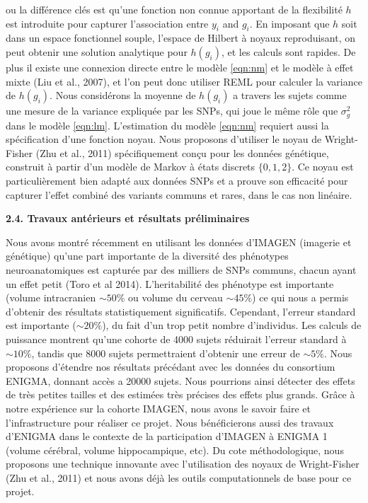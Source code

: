 \documentclass[12pt]{article}
\begin{document}
ou la diff\'erence cl\'es est qu'une fonction non connue apportant de la flexibilit\'e $h$ est introduite pour capturer l'association entre $y_i$ and $g_i$. En imposant que $h$ soit dans un espace fonctionnel souple, l'espace de Hilbert \`a noyaux reproduisant, on peut obtenir une solution analytique pour $h(g_i)$, et les calculs sont rapides. De plus il existe une connexion directe entre le mod\`ele  \eqref{eqn:nm} et le mod\`ele \`a effet mixte (Liu et al., 2007), et l'on peut donc utiliser REML pour calculer la variance de $h(g_i)$. Nous consid\'erons la moyenne de $h(g_i)$ a travers les sujets comme une mesure de la variance expliqu\'ee par les SNPs, qui joue le même rôle que $\sigma^2_g$ dans le mod\`ele \eqref{eqn:lm}. L'estimation du mod\`ele  \eqref{eqn:nm} requiert aussi la sp\'ecification d'une fonction noyau. Nous proposons d'utiliser le noyau de  Wright-Fisher (Zhu et al., 2011) sp\'ecifiquement conçu pour les donn\'ees g\'en\'etique, construit \`a partir d'un mod\`ele de Markov \`a \'etats discrets  $\{0,1,2\}$. Ce noyau est particuli\`erement bien adapt\'e aux donn\'ees SNPs et a prouve son efficacit\'e pour capturer l'effet combin\'e des variants communs et rares, dans le cas non lin\'eaire.
\medskip

\noindent
\textbf{2.4. Travaux ant\'erieurs et r\'esultats pr\'eliminaires}
\smallskip

\noindent
Nous avons montr\'e r\'ecemment en utilisant les donn\'ees d'IMAGEN (imagerie et g\'en\'etique) qu'une part importante de la diversit\'e des ph\'enotypes neuroanatomiques est captur\'ee par des milliers de SNPs communs, chacun ayant un effet petit (Toro et al 2014). L'heritabilit\'e des ph\'enotype est importante (volume intracranien $\sim 50\%$ ou volume du cerveau $\sim 45\%$) ce qui nous a permis d'obtenir des r\'esultats statistiquement significatifs. Cependant, l'erreur standard est importante  ($\sim 20\%$), du fait d'un trop petit nombre d'individus. Les calculs de puissance montrent qu'une cohorte de 4000 sujets r\'eduirait l'erreur standard \`a $\sim 10\%$, tandis que 8000 sujets permettraient d'obtenir une erreur de $\sim 5\%$. Nous proposons d'\'etendre nos r\'esultats pr\'ec\'edant avec les donn\'ees du consortium ENIGMA, donnant acc\`es a 20000 sujets. Nous pourrions ainsi d\'etecter des effets de tr\`es petites tailles et des estim\'ees tr\`es pr\'ecises des effets plus grands. Grâce \`a notre exp\'erience sur la cohorte IMAGEN, nous avons le savoir faire et l'infrastructure pour r\'ealiser ce projet. Nous b\'en\'eficierons aussi des travaux d'ENIGMA dans le contexte de la participation d'IMAGEN \`a ENIGMA 1 (volume c\'er\'ebral, volume hippocampique, etc). Du cote m\'ethodologique, nous proposons une technique innovante avec l'utilisation des noyaux de  Wright-Fisher (Zhu et al., 2011) et nous avons d\'ej\`a les outils computationnels de base pour ce projet.
\bigskip
\end{document}
